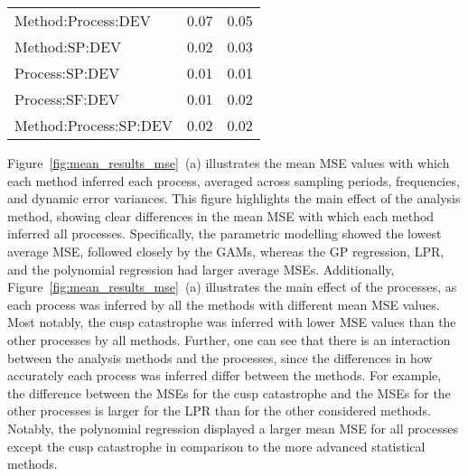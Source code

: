 \documentclass[man, floatsintext]{apa7}
\begin{document}
\begin{table}[tbp]
\begin{center}
\begin{threeparttable}
\begin{tabular}{lll}
        \\
        Method:Process:DEV    & 0.07                                     & 0.05
        \\
        Method:SP:DEV         & 0.02                                     & 0.03
        \\
        Process:SP:DEV        & 0.01                                     & 0.01
        \\
        Process:SF:DEV        & 0.01                                     & 0.02
        \\
        Method:Process:SP:DEV & 0.02                                     & 0.02
        \\
        \bottomrule
      \end{tabular}
    \end{threeparttable}
  \end{center}

\end{table}

Figure~\ref{fig:mean_results_mse}~(a) illustrates the mean MSE values with
which each method inferred each process, averaged across sampling periods,
frequencies, and dynamic error variances. This figure highlights the main
effect of the analysis method, showing clear differences in the mean MSE
with which each method inferred all processes. Specifically, the parametric
modelling showed the lowest average MSE, followed closely by the GAMs, whereas
the GP regression, LPR, and the polynomial regression had larger average MSEs.
Additionally, Figure~\ref{fig:mean_results_mse}~(a) illustrates the main effect
of the processes, as each process was inferred by all the methods with
different mean MSE values. Most notably, the cusp catastrophe was inferred with
lower MSE values than the other processes by all methods. Further, one can see
that there is an interaction between the analysis methods and the processes,
since the differences in how accurately each process was inferred differ
between the methods. For example, the difference between the MSEs for the cusp
catastrophe and the MSEs for the other processes is larger for the LPR than for
the other considered methods. Notably, the polynomial regression displayed a
larger mean MSE for all processes except the cusp catastrophe in comparison to
the more advanced statistical methods.
\end{document}
